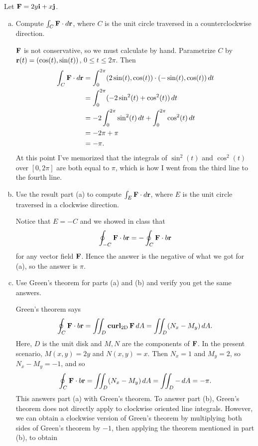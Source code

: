 \begin{problem}
  Let $\mathbf F=2y\mathbf i+x\mathbf j$.
  \begin{enumerate}[(a)]
    \item Compute $\int_C\mathbf F\cdot d\mathbf r$, where $C$ is the unit circle traversed in a counterclockwise direction.
    \begin{solution}
      $\mathbf F$ is not conservative, so we must calculate by hand. Parametrize $C$ by $\mathbf r(t)=(\cos(t),\sin(t))$, $0\leq t\leq 2\pi$. Then
      \[\begin{split}
        \int_C\mathbf F\cdot d\mathbf r &= \int_0^{2\pi}(2\sin(t),\cos(t))\cdot (-\sin(t),\cos(t))\,dt\\
        &= \int_0^{2\pi} (-2\sin^2(t)+\cos^2(t))\,dt\\
        &= -2\int_0^{2\pi}\sin^2(t)\,dt+\int_0^{2\pi}\cos^2(t)\,dt\\
        &= -2\pi+\pi\\
        &= -\pi.
      \end{split}\]
      At this point I've memorized that the integrals of $\sin^2(t)$ and $\cos^2(t)$ over $[0,2\pi]$ are both equal to $\pi$, which is how I went from the third line to the fourth line.
    \end{solution}
    \item Use the result part (a) to compute $\int_E \mathbf F\cdot d\mathbf r$, where $E$ is the unit circle traversed in a clockwise direction.
    \begin{solution}
      Notice that $E=-C$ and we showed in class that
      \[\oint_{-C}\mathbf F\cdot b\mathbf r=-\oint_C\mathbf F\cdot b\mathbf r\]
      for any vector field $\mathbf F$. Hence the answer is the negative of what we got for (a), so the answer is $\pi$.
    \end{solution}
    \item Use Green's theorem for parts (a) and (b) and verify you get the same answers.
    \begin{solution}
      Green's theorem says
      \[\oint_C\mathbf F\cdot b\mathbf r = \iint_D\operatorname{\mathbf{curl}}_\text{2D}\mathbf F\,dA=\iint_D(N_x-M_y)\,dA.\]
      Here, $D$ is the unit disk and $M,N$ are the components of $\mathbf F$. In the present scenario, $M(x,y)=2y$ and $N(x,y)=x$. Then $N_x=1$ and $M_y=2$, so $N_x-M_y=-1$, and so
      \[\oint_C\mathbf F\cdot b\mathbf r=\iint_D (N_x-M_y)\,dA=\iint_D-\,dA=-\pi.\]
      This answers part (a) with Green's theorem. To answer part (b), Green's theorem does not directly apply to clockwise oriented line integrals. However, we can obtain a clockwise version of Green's theorem by multiplying both sides of Green's theorem by $-1$, then applying the theorem mentioned in part (b), to obtain

\end{solution}
\end{enumerate}
\end{problem}
